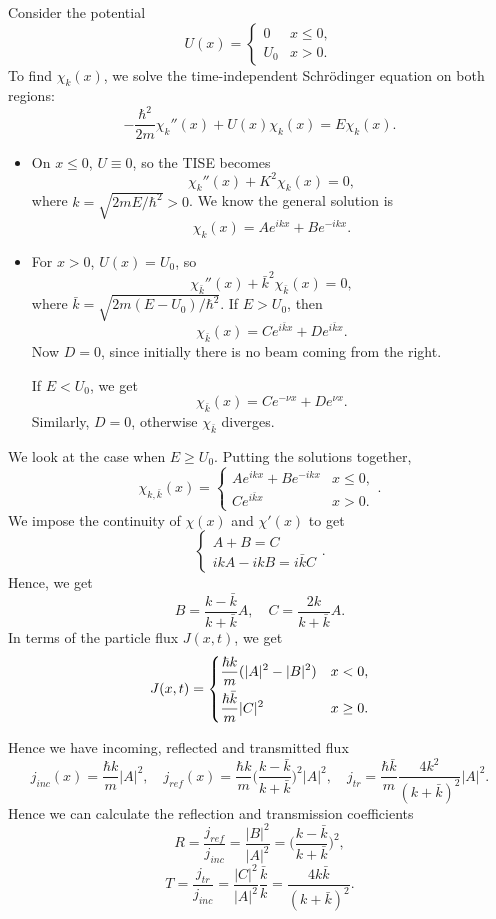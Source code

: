 \documentclass[12pt]{article}
\begin{document}
Consider the potential
\[
	U(x) =
	\begin{cases}
		0 & x \leq 0, \\
		U_0 & x > 0.
	\end{cases}
\]
To find $\chi_k(x)$, we solve the time-independent Schr\"{o}dinger equation on both regions:
\[
	- \frac{\hbar^2}{2m} \chi_k''(x) + U(x) \chi_k(x) = E \chi_k(x)
.\]
\begin{itemize}
	\item On $x \leq 0$, $U \equiv 0$, so the TISE becomes
		\[
			\chi_k''(x) + K^2 \chi_k(x) = 0
		,\]
		where $k = \sqrt{2mE/\hbar^2} > 0$. We know the general solution is
		\[
			\chi_k(x) = Ae^{ikx} + Be^{-ikx}
		.\]
	\item For $x > 0$, $U(x) = U_0$, so
		\[
			\chi_{\bar k}''(x) + \bar k^2 \chi_{\bar k}(x) = 0
		,\]
		where $\bar k = \sqrt{2m(E - U_0)/\hbar^2}$. If $E > U_0$, then
		\[
			\chi_{\bar k}(x) = Ce^{i \bar k x} + De^{i \bar k x}
		.\]
		Now $D = 0$, since initially there is no beam coming from the right.

		If $E < U_0$, we get
		\[
			\chi_{\bar k}(x) = C e^{- \nu x} + D e^{\nu x}
		.\]
		Similarly, $D = 0$, otherwise $\chi_{\bar k}$ diverges.
\end{itemize}
We look at the case when $E \geq U_0$. Putting the solutions together,
\[
	\chi_{k, \bar k}(x) =
	\begin{cases}
		A e^{ikx} + Be^{-ikx} & x \leq 0, \\
		Ce^{i\bar k x} & x > 0.
	\end{cases}
.\]
We impose the continuity of $\chi(x)$ and $\chi'(x)$ to get
\[
\begin{cases}
	A + B = C \\
	ikA - ikB = i \bar k C
\end{cases}
.\]
Hence, we get
\[
B = \frac{k - \bar k}{k + \bar k} A, \quad C = \frac{2k}{k + \bar k} A
.\]
In terms of the particle flux $J(x, t)$, we get
\[
	J(x, t) =
	\begin{dcases}
		\frac{\hbar k}{m}(|A|^2 - |B|^2) & x < 0, \\
		\frac{\hbar \bar k}{m} |C|^2 & x \geq 0.
	\end{dcases}
\]

Hence we have incoming, reflected and transmitted flux
\[
	j_{inc}(x) = \frac{\hbar k}{m}|A|^2, \quad j_{ref}(x) = \frac{\hbar k}{m} \biggl(\frac{k - \bar k}{k + \bar k}\biggr)^2 |A|^2, \quad j_{tr} = \frac{\hbar \bar k}{m} \frac{4k^2}{(k + \bar k)^2}|A|^2
.\]
Hence we can calculate the reflection and transmission coefficients
\[
	R = \frac{j_{ref}}{j_{inc}} = \frac{|B|^2}{|A|^2} = \biggl( \frac{k - \bar k}{k + \bar k}\biggr)^2
,\]
\[
	T = \frac{j_{tr}}{j_{inc}} = \frac{|C|^2}{|A|^2}\frac{\bar k}{k} = \frac{4 k \bar k}{(k + \bar k)^2}
.\]
\end{document}

